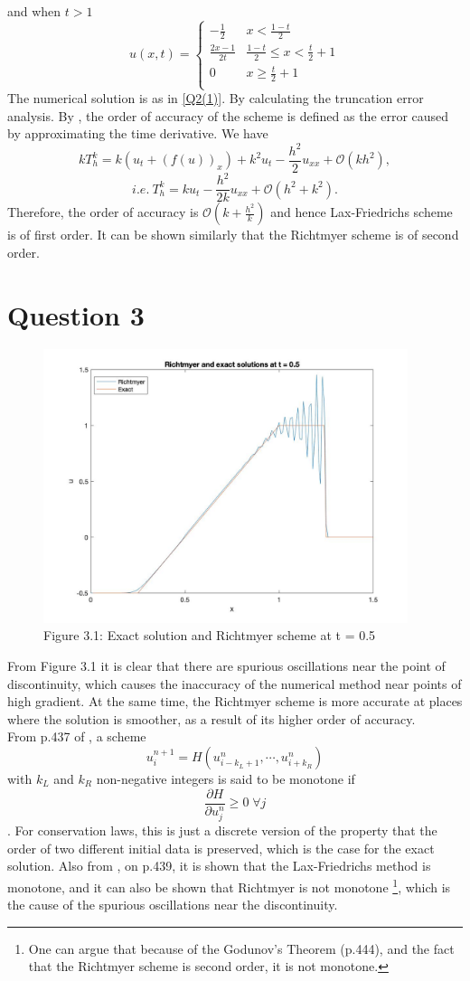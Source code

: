 \documentclass[a4paper,11pt]{article}
\begin{document}
and when $t>1$
\[
 u(x,t)=\begin{cases}
               -\frac{1}{2} & x< \frac{1-t}{2}\\
               \frac{2x-1}{2t} & \frac{1-t}{2}\leqslant x<\frac{t}{2}+1\\ 
               0 & x\geqslant \frac{t}{2}+1\\
            \end{cases}
\]
The numerical solution is as in \ref{Q2(1)}. By calculating the truncation error analysis. By \cite{Toro}, the order of accuracy of the scheme is defined as the error caused by approximating the time derivative. We have $$kT_{h}^{k} = k(u_t +(f(u))_x) + k^2 u_t - \frac{h^2}{2} u_{xx} + \mathcal{O}(kh^2), $$ $$ i.e.\ T_{h}^{k}= k u_t - \frac{h^2}{2k} u_{xx} + \mathcal{O}(h^2+k^2).$$ Therefore, the order of accuracy is $\mathcal{O}(k+\frac{h^2}{k})$ and hence Lax-Friedrichs scheme is of first order. It can be shown similarly that the Richtmyer scheme is of second order.
\section{Question 3}
\begin{figure}[H]
 \center
 \includegraphics[width = 0.9\linewidth, height =8cm]{Q3.jpg}
 \caption{Figure 3.1: Exact solution and Richtmyer scheme at t = 0.5}
 \label{Q3}
\end{figure}
From Figure 3.1 it is clear that there are spurious oscillations near the point of discontinuity, which causes the inaccuracy of the numerical method near points of high gradient. At the same time, the Richtmyer scheme is more accurate at places where the solution is smoother, as a result of its higher order of accuracy.\\
From p.437 of \cite{Toro}, a scheme $$u_{i}^{n+1} = H(u^{n}_{i-k_L +1}, \cdots, u^{n}_{i+k_R})$$ with $k_L$ and $k_R$ non-negative integers is said to be monotone if $$ \frac{\partial H}{\partial u_j^n} \geq 0\; \forall j$$. For conservation laws, this is just a discrete version of the property that the order of two different initial data is preserved, which is the case for the exact solution. Also from \cite{Toro}, on p.439, it is shown that the Lax-Friedrichs method is monotone, and it can also be shown that Richtmyer is not monotone \footnote{One can argue that because of the Godunov's Theorem (p.444), and the fact that the Richtmyer scheme is second order, it is not monotone.}, which is the cause of the spurious oscillations near the discontinuity.
\end{document}
